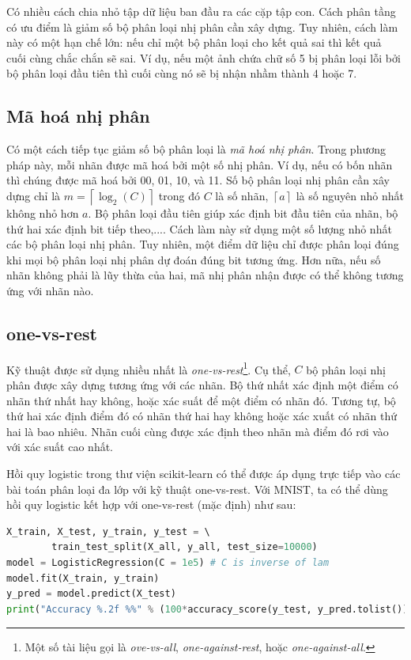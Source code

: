 Có nhiều cách chia nhỏ tập dữ liệu ban đầu ra các cặp tập con. Cách phân tầng có ưu điểm là giảm số bộ phân loại nhị phân cần xây dựng. Tuy nhiên, cách làm này có một hạn chế lớn: nếu chỉ một bộ phân loại cho kết quả sai thì kết quả cuối cùng chắc chắn sẽ sai. Ví dụ, nếu một ảnh chứa chữ
số {5} bị phân loại lỗi bởi bộ phân loại đầu tiên thì cuối cùng nó sẽ bị nhận nhầm thành 4 hoặc 7. 
 
 
\subsection{Mã hoá nhị phân}
Có một cách tiếp tục giảm số bộ phân loại là \textit{mã hoá nhị phân}. Trong phương pháp này, mỗi nhãn được mã hoá bởi một số nhị phân. Ví dụ, nếu có bốn nhãn thì chúng được mã hoá bởi 00, 01, 10, và 11. Số bộ phân loại nhị phân cần xây dựng chỉ là $m =
\left\lceil\log_2(C)\right\rceil$ trong đó $C$ là số nhãn, $\left\lceil a
\right\rceil$ là {số nguyên nhỏ nhất không nhỏ hơn} $a$. Bộ phân loại đầu tiên giúp xác định bit đầu tiên của nhãn, bộ thứ hai xác định bit tiếp theo,....
Cách làm này sử dụng một số lượng nhỏ nhất các bộ phân loại nhị phân. Tuy
nhiên, một điểm dữ liệu chỉ được phân loại đúng khi mọi bộ phân loại nhị phân dự đoán đúng bit tương ứng. Hơn nữa, nếu số nhãn không phải là lũy thừa của hai,
mã nhị phân nhận được có thể không tương ứng với nhãn nào. 
 
 
\subsection{one-vs-rest}
Kỹ thuật được sử dụng nhiều nhất là \textit{one-vs-rest}\footnote{Một số tài
liệu gọi là \textit{ove-vs-all}, \textit{one-against-rest}, hoặc
\textit{one-against-all}.}. Cụ thể, $C$ bộ phân loại nhị phân được xây dựng
tương ứng với các nhãn. Bộ thứ nhất xác định một điểm có nhãn thứ nhất hay
không, hoặc xác suất để một điểm có nhãn đó. Tương tự, bộ thứ hai xác định điểm
đó có nhãn thứ hai hay không hoặc xác xuất có nhãn thứ hai là bao nhiêu. Nhãn
cuối cùng được xác định theo nhãn mà điểm đó rơi vào với xác suất cao nhất.

 
 
Hồi quy logistic trong thư viện scikit-learn có thể được áp dụng trực tiếp
vào các bài toán phân loại đa lớp với kỹ thuật {one-vs-rest}. Với MNIST, ta có thể dùng hồi quy logistic kết hợp với one-vs-rest (mặc định) như sau: 
\begin{lstlisting}[language=Python]
X_train, X_test, y_train, y_test = \ 
        train_test_split(X_all, y_all, test_size=10000)
model = LogisticRegression(C = 1e5) # C is inverse of lam 
model.fit(X_train, y_train)
y_pred = model.predict(X_test)
print("Accuracy %.2f %%" % (100*accuracy_score(y_test, y_pred.tolist())))
\end{lstlisting}
 
